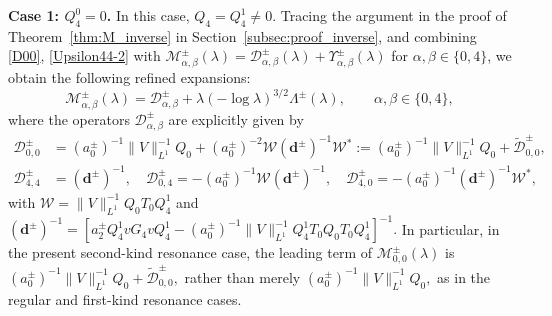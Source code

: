 \documentclass[reqno]{amsart}
\numberwithin{equation}{section}
\begin{document}
\textbf{Case 1: \(Q_4^0=0\).}
In this case, \(Q_4=Q_4^1\neq0\). Tracing the argument in the proof of
Theorem~\ref{thm:M_inverse} in
Section~\ref{subsec:proof_inverse}, and combining
\eqref{D00}, \eqref{Upsilon44-2} with $
\mathcal M_{\alpha,\beta}^\pm(\lambda)=\mathcal D_{\alpha,\beta}^\pm(\lambda)+\Upsilon_{\alpha,\beta}^\pm(\lambda)
$ for $\alpha,\beta \in \{0,4\}$, we obtain 
the following refined expansions:
\[
	\mathcal{M}_{\alpha,\beta}^{\pm}(\lambda) = \mathcal{D}_{\alpha,\beta}^{\pm} + \lambda (-\log \lambda)^{3/2} \Lambda^\pm(\lambda), \qquad \alpha,\beta \in \{0,4\}, 
\] where
the operators $\mathcal{D}_{\alpha,\beta}^{\pm}$ are explicitly given by  
\begin{align}\label{Doo}
	\mathcal{D}_{0,0}^{\pm} &= (a_0^\pm)^{-1} \|V\|_{L^1}^{-1}Q_0 + (a_0^\pm)^{-2}\mathcal{W} (\boldsymbol{d}^\pm)^{-1} \mathcal{W}^* := (a_0^\pm)^{-1} \|V\|_{L^1}^{-1}Q_0 + \widetilde{\mathcal{D}}_{0,0}^{\pm}, \\
	\label{eq:expre_D_00} 
	\mathcal{D}_{4,4}^{\pm} &= (\boldsymbol{d}^\pm)^{-1}, \quad  
	\mathcal{D}_{0,4}^{\pm} = - (a_0^\pm)^{-1}  \mathcal{W} (\boldsymbol{d}^\pm)^{-1}, \quad  
	\mathcal{D}_{4,0}^{\pm} = - (a_0^\pm)^{-1} (\boldsymbol{d}^\pm)^{-1} \mathcal{W}^*,
\end{align}  
with $\mathcal{W} = \|V\|_{L^1}^{-1}Q_0 T_0 Q_4^1$ and  
$
(\boldsymbol{d}^\pm)^{-1} = [a_2^\pm Q_4^1 v G_4 v Q_4^1 - (a_0^\pm)^{-1} \|V\|_{L^1}^{-1} Q_4^1 T_0  Q_0 T_0 Q_4^1]^{-1}.  
$  In particular, in the present second-kind resonance case, the leading
term of \(\mathcal M_{0,0}^\pm(\lambda)\) is
$
(a_0^\pm)^{-1}\|V\|_{L^1}^{-1}Q_0
+
\widetilde{\mathcal D}_{0,0}^\pm,
$
rather than merely
$
(a_0^\pm)^{-1}\|V\|_{L^1}^{-1}Q_0,
$
as in the regular and first-kind resonance cases.
\end{document}
